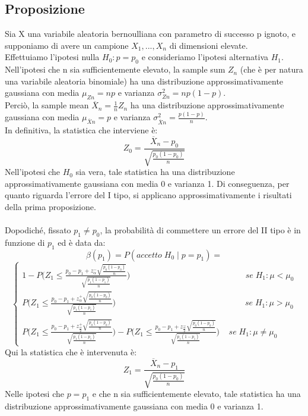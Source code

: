 \documentclass{article}
\begin{document}
\subsection*{Proposizione}
Sia X una variabile aleatoria bernoulliana con parametro di successo p ignoto, e supponiamo di avere un campione $X_{1},...,X_{n}$ di dimensioni elevate.\\
Effettuiamo l'ipotesi nulla $H_{0}: p = p_{0}$ e consideriamo l'ipotesi alternativa $H_{1}$.\\
Nell'ipotesi che n sia sufficientemente elevato, la sample sum $Z_{n}$ (che è per natura una variabile aleatoria binomiale) ha una distribuzione approssimativamente gaussiana con media $\mu_{Zn} = np$ e varianza $\sigma_{Zn}^{2} = np(1-p)$.\\
Perciò, la sample mean $\overline{X}_{n} = \frac{1}{n}Z_{n}$ ha una distribuzione approssimativamente gaussiana con media $\mu_{\overline{X}n} = p$ e varianza $\sigma_{\overline{X}n}^{2} = \frac{p(1-p)}{n}$.\\
In definitiva, la statistica che interviene è:
\[ Z_{0} = \frac{\overline{X}_{n}-p_{0}}{\sqrt{\frac{p_{0}(1-p_{0})}{n}}} \]
Nell'ipotesi che $H_{0}$ sia vera, tale statistica ha una distribuzione approssimativamente gaussiana con media 0 e varianza 1. Di conseguenza, per quanto riguarda l'errore del I tipo, si applicano approssimativamente i risultati della prima proposizione.\\
\\
Dopodiché, fissato $p_{1} \neq p_{0}$, la probabilità di commettere un errore del II tipo è in funzione di $p_{1}$ ed è data da:
\[ \beta(p_{1}) = P(accetto \;  H_{0} \; | \; p = p_{1}) = \]
\[
\begin{cases}
1 - P\Bigg(Z_{1} \leq \frac{p_{0} - p_{1} + z_{\alpha}^{-} \sqrt{\frac{p_{0}(1-p_{0})}{n}}}{\sqrt{\frac{p_{1}(1-p_{1})}{n}}}\Bigg) \; \; \; \; \; \; \; \; \; \; \; \; \; \; \; \; \; \; \; \; \; \; \; \; \; \; \; \; \; \; \; \; \; \; \; \; \; \; \; \; \; \; \; \; \; \; \; \; \; \; se \; H_{1}: \mu < \mu_{0}\\
P\Bigg(Z_{1} \leq \frac{p_{0} - p_{1} + z_{\alpha}^{+} \sqrt{\frac{p_{0}(1-p_{0})}{n}}}{\sqrt{\frac{p_{1}(1-p_{1})}{n}}}\Bigg) \; \; \; \; \; \; \; \; \; \; \; \; \; \; \; \; \; \; \; \; \; \; \; \; \; \; \; \; \; \; \; \; \; \; \; \; \; \; \; \; \; \; \; \; \; \; \; \; \; \; \; \; \; \; \; \; se \; H_{1}: \mu > \mu_{0}\\
P\Bigg(Z_{1} \leq \frac{p_{0} - p_{1} + z_{\frac{\alpha}{2}}^{+} \sqrt{\frac{p_{0}(1-p_{0})}{n}}}{\sqrt{\frac{p_{1}(1-p_{1})}{n}}}\Bigg) - P\Bigg(Z_{1} \leq \frac{p_{0} - p_{1} + z_{\frac{\alpha}{2}}^{-} \sqrt{\frac{p_{0}(1-p_{0})}{n}}}{\sqrt{\frac{p_{1}(1-p_{1})}{n}}}\Bigg) \; \; \; \; se \; H_{1}: \mu \neq \mu_{0}
\end{cases}
\]
Qui la statistica che è intervenuta è:
\[ Z_{1} = \frac{\overline{X}_{n} - p_{1}}{\sqrt{\frac{p_{0}(1-p_{0})}{n}}} \]
Nelle ipotesi che $p = p_{1}$ e che n sia sufficientemente elevato, tale statistica ha una distribuzione approssimativamente gaussiana con media 0 e varianza 1.
\end{document}
